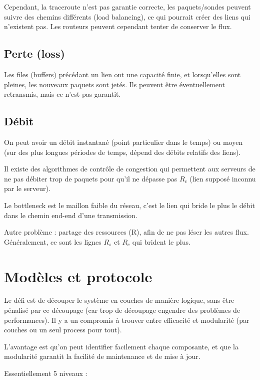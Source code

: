 		Cependant, la traceroute n'est pas garantie correcte, les paquets/sondes peuvent suivre des chemins différents (load balancing), ce qui pourrait créer des liens qui n'existent pas. Les routeurs peuvent cependant tenter de conserver le flux.
		
		
	\subsection{Perte (loss)}
	
	Les files (buffers) précédant un lien ont une capacité finie, et lorsqu'elles sont pleines, les nouveaux paquets sont jetés. Ils peuvent être éventuellement retransmis, mais ce n'est pas garantit.
	
	\subsection{Débit}
	
	On peut avoir un débit instantané (point particulier dans le temps) ou moyen (sur des plus longues périodes de temps, dépend des débits relatifs des liens).
	
	Il existe des algorithmes de contrôle de congestion qui permettent aux serveurs de ne pas débiter trop de paquets pour qu'il ne dépasse pas $R_c$ (lien supposé inconnu par le serveur).
	
	Le bottleneck est le maillon faible du réseau, c'est le lien qui bride le plus le débit dans le chemin end-end d'une transmission.
	
	Autre problème : partage des ressources (R), afin de ne pas léser les autres flux. Généralement, ce sont les lignes $R_s$ et $R_c$ qui brident le plus.
	
	
	
\section{Modèles et protocole}

Le défi est de découper le système en couches de manière logique, sans être pénalisé par ce découpage (car trop de découpage engendre des problèmes de performances). Il y a un compromis à trouver entre efficacité et modularité (par couches ou un seul process pour tout).

L'avantage est qu'on peut identifier facilement chaque composante, et que la modularité garantit la facilité de maintenance et de mise à jour.
	
Essentiellement 5 niveaux :

